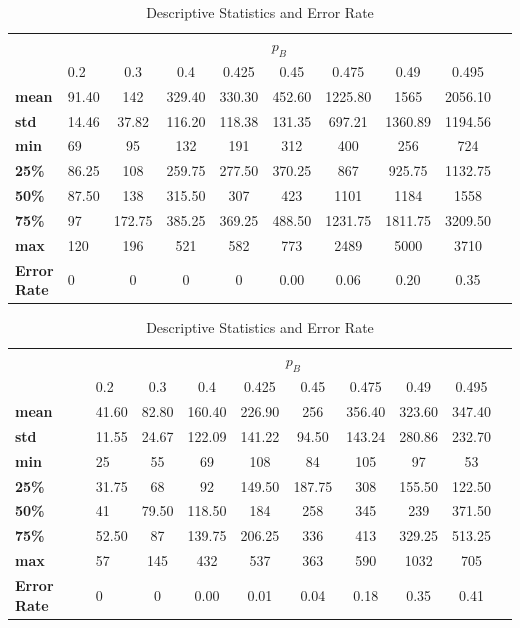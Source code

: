 \documentclass[magisterska, english]{pwr_wmat_praca_dyplomowa}
\theoremstyle{plain}
\numberwithin{theorem}{chapter}
\theoremstyle{definition}
\numberwithin{theorem}{chapter}
\begin{document}
\begin{table}
	\centering
	\caption{Descriptive Statistics and Error Rate}
	\label{tab:descriptive_stats}
	\begin{tabular}{llcccccccc}
		\toprule
		& \multicolumn{8}{c}{$p_B$} \\ \cmidrule(lr){2-9}
		& 0.2 & 0.3 & 0.4 & 0.425 & 0.45 & 0.475 & 0.49 & 0.495 \\
		\midrule
		\textbf{mean} & 91.40 & 142 & 329.40 & 330.30 & 452.60 & 1225.80 & 1565 & 2056.10 \\
		\textbf{std} & 14.46 & 37.82 & 116.20 & 118.38 & 131.35 & 697.21 & 1360.89 & 1194.56 \\
		\textbf{min} & 69 & 95 & 132 & 191 & 312 & 400 & 256 & 724 \\
		\textbf{25\%} & 86.25 & 108 & 259.75 & 277.50 & 370.25 & 867 & 925.75 & 1132.75 \\
		\textbf{50\%} & 87.50 & 138 & 315.50 & 307 & 423 & 1101 & 1184 & 1558 \\
		\textbf{75\%} & 97 & 172.75 & 385.25 & 369.25 & 488.50 & 1231.75 & 1811.75 & 3209.50 \\
		\textbf{max} & 120 & 196 & 521 & 582 & 773 & 2489 & 5000 & 3710 \\
		\textbf{Error Rate} & 0 & 0 & 0 & 0 & 0.00 & 0.06 & 0.20 & 0.35 \\
		\bottomrule
	\end{tabular}
\end{table}

\begin{table}
	\centering
	\caption{Descriptive Statistics and Error Rate}
	\label{tab:descriptive_stats}
	\begin{tabular}{llcccccccc}
		\toprule
		& \multicolumn{8}{c}{$p_B$} \\ \cmidrule(lr){2-9}
		& 0.2 & 0.3 & 0.4 & 0.425 & 0.45 & 0.475 & 0.49 & 0.495 \\
		\midrule
		\textbf{mean} & 41.60 & 82.80 & 160.40 & 226.90 & 256 & 356.40 & 323.60 & 347.40 \\
		\textbf{std} & 11.55 & 24.67 & 122.09 & 141.22 & 94.50 & 143.24 & 280.86 & 232.70 \\
		\textbf{min} & 25 & 55 & 69 & 108 & 84 & 105 & 97 & 53 \\
		\textbf{25\%} & 31.75 & 68 & 92 & 149.50 & 187.75 & 308 & 155.50 & 122.50 \\
		\textbf{50\%} & 41 & 79.50 & 118.50 & 184 & 258 & 345 & 239 & 371.50 \\
		\textbf{75\%} & 52.50 & 87 & 139.75 & 206.25 & 336 & 413 & 329.25 & 513.25 \\
		\textbf{max} & 57 & 145 & 432 & 537 & 363 & 590 & 1032 & 705 \\
		\textbf{Error Rate} & 0 & 0 & 0.00 & 0.01 & 0.04 & 0.18 & 0.35 & 0.41 \\
		\bottomrule
	\end{tabular}
\end{table}
\end{document}
